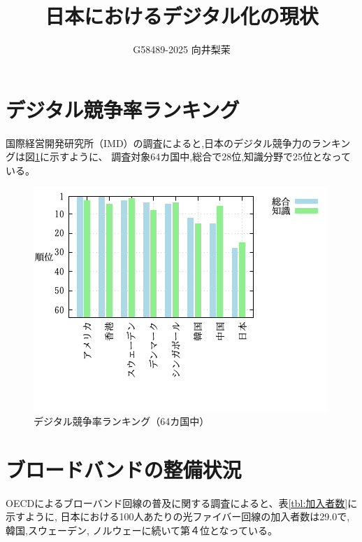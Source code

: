 \documentclass[a4paper,11pt,dvipdfmx]{ujarticle}
\title{日本におけるデジタル化の現状}
\author{G58489-2025 向井梨茉}
\begin{document}
\maketitle 

\section{デジタル競争率ランキング}

国際経営開発研究所（IMD）の調査\cite{IMD}によると,日本のデジタル競争力のランキングは図\ref{fig:競争率}に示すように、
調査対象64カ国中,総合で28位,知識分野で25位となっている。

\begin{figure}[htbp]
    \centering
    \includegraphics{fig31.png}
    \caption{デジタル競争率ランキング（64カ国中）}\label{fig:競争率}
\end{figure}





\section{ブロードバンドの整備状況}

OECDによるブローバンド回線の普及に関する調査\cite{oecd}によると、表\ref{tbl:加入者数}に示すように,
日本における100人あたりの光ファイバー回線の加入者数は29.0で,
韓国,スウェーデン,
ノルウェーに続いて第４位となっている。
\end{document}
